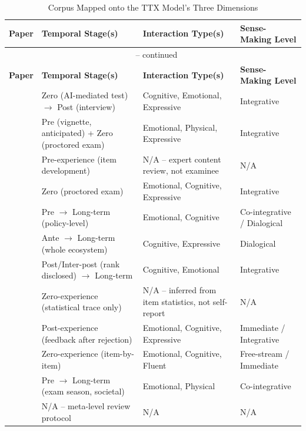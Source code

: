 \documentclass[11pt]{article}
\begin{document}
{\small
\begin{longtable}{p{2.6cm} p{4.3cm} p{4.3cm} p{3.3cm}}
\caption{Corpus Mapped onto the TTX Model's Three Dimensions} \label{tab:mapping} \\
\toprule
\textbf{Paper} & \textbf{Temporal Stage(s)} & \textbf{Interaction Type(s)} & \textbf{Sense-Making Level} \\
\midrule
\endfirsthead
\multicolumn{4}{c}{\tablename\ \thetable{} -- continued} \\
\toprule
\textbf{Paper} & \textbf{Temporal Stage(s)} & \textbf{Interaction Type(s)} & \textbf{Sense-Making Level} \\
\midrule
\endhead
\bottomrule
\endfoot
\citet{zhang2023testtakers} & Zero (AI-mediated test) $\rightarrow$ Post (interview) & Cognitive, Emotional, Expressive & Integrative \\
\citet{mukherjee2024proctoring} & Pre (vignette, anticipated) + Zero (proctored exam) & Emotional, Physical, Expressive & Integrative \\
\citet{stowe2024fairness} & Pre-experience (item development) & N/A -- expert content review, not examinee & N/A \\
\citet{balash2021examiners} & Zero (proctored exam) & Emotional, Cognitive, Expressive & Integrative \\
\citet{zhangw2024naplan} & Pre $\rightarrow$ Long-term (policy-level) & Emotional, Cognitive & Co-integrative / Dialogical \\
\citet{burstein2024responsible} & Ante $\rightarrow$ Long-term (whole ecosystem) & Cognitive, Expressive & Dialogical \\
\citet{ladant2023saliency} & Post/Inter-post (rank disclosed) $\rightarrow$ Long-term & Cognitive, Emotional & Integrative \\
\citet{suk2026unfairness} & Zero-experience (statistical trace only) & N/A -- inferred from item statistics, not self-report & N/A \\
\citet{feeney2022rejection} & Post-experience (feedback after rejection) & Emotional, Cognitive, Expressive & Immediate / Integrative \\
\citet{watson2026cat} & Zero-experience (item-by-item) & Emotional, Cognitive, Fluent & Free-stream / Immediate \\
\citet{george2024examstress} & Pre $\rightarrow$ Long-term (exam season, societal) & Emotional, Physical & Co-integrative \\
\citet{kaleta2025studentperspectives} & N/A -- meta-level review protocol & N/A & N/A \\

\end{longtable}}
\end{document}
